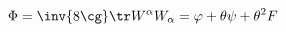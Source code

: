 \begin{equation}
\label{eq:Phidef}
\Phi = \inv{8 \cg} \tr W^\alpha W_\alpha = \varphi + \theta \psi + \theta^2 F
\end{equation}


